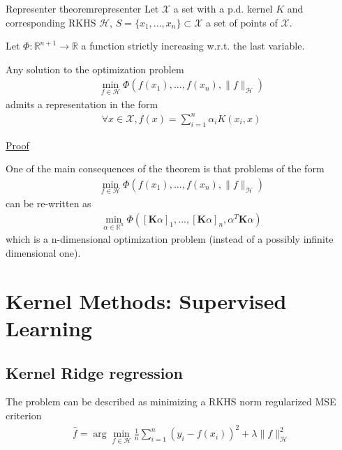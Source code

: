 \documentclass[10pt]{article}
\begin{document}
\begin{Theorem}{Representer theorem}{representer}
  Let $\mathcal{X}$ a set with a p.d. kernel $K$ and corresponding RKHS 
  $\mathcal{H}$, $S = \{x_1, ..., x_n\} \subset \mathcal{X}$ a set of points of 
  $\mathcal{X}$.

  Let $\Phi : \mathbb{R}^{n+1} \rightarrow \mathbb{R}$ a function strictly 
  increasing w.r.t. the last variable.

  Any solution to the optimization problem
  \begin{align*}
    \min_{f\in \mathcal{H}} \Phi(f(x_1), ..., f(x_n), \lVert f
    \rVert_\mathcal{H})
  \end{align*}
  admits a representation in the form 
  \begin{align*}
    \forall x \in \mathcal{X}, f(x) = \sum_{i=1}^n \alpha_i K(x_i, x)
  \end{align*}

  \par\hfill \hyperref[prf:representer]{\small Proof}
\end{Theorem}

One of the main consequences of the theorem is that problems of the form 
\begin{align*}
  \min_{f\in \mathcal{H}} \Phi(f(x_1), ..., f(x_n), \lVert f
  \rVert_\mathcal{H})
\end{align*}
can be re-written as 
\begin{align*}
  \min_{\alpha\in \mathbb{R}^n} \Phi([\mathbf{K}\alpha]_1, ..., 
  [\mathbf{K}\alpha]_n, \alpha^T \mathbf{K} \alpha)
\end{align*}
which is a n-dimensional optimization problem (instead of a possibly infinite 
dimensional one).

\section{Kernel Methods: Supervised Learning}

\subsection{Kernel Ridge regression}

The problem can be described as minimizing a RKHS norm regularized MSE criterion
\begin{align*}
  \hat{f} = \arg\min_{f\in \mathcal{H}} \frac{1}{n}\sum_{i=1}^n(y_i - f(x_i))^2
  + \lambda\lVert f\rVert^2_\mathcal{H}
\end{align*} 
\end{document}
